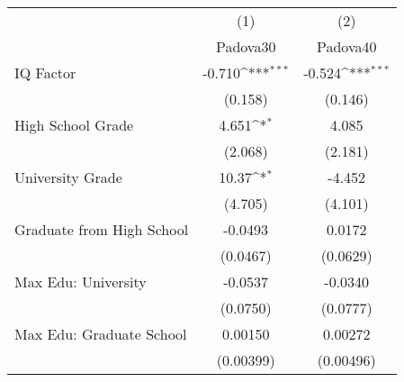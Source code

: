 {
\def\sym#1{\ifmmode^{#1}\else\(^{#1}\)\fi}
\begin{tabular}{l*{2}{c}}
\toprule
            &\multicolumn{1}{c}{(1)}&\multicolumn{1}{c}{(2)}\\
            &\multicolumn{1}{c}{Padova30}&\multicolumn{1}{c}{Padova40}\\
\midrule
IQ Factor   &      -0.710\sym{***}&      -0.524\sym{***}\\
            &     (0.158)         &     (0.146)         \\
\addlinespace
High School Grade&       4.651\sym{*}  &       4.085         \\
            &     (2.068)         &     (2.181)         \\
\addlinespace
University Grade&       10.37\sym{*}  &      -4.452         \\
            &     (4.705)         &     (4.101)         \\
\addlinespace
Graduate from High School&     -0.0493         &      0.0172         \\
            &    (0.0467)         &    (0.0629)         \\
\addlinespace
Max Edu: University&     -0.0537         &     -0.0340         \\
            &    (0.0750)         &    (0.0777)         \\
\addlinespace
Max Edu: Graduate School&     0.00150         &     0.00272         \\
            &   (0.00399)         &   (0.00496)         \\
\bottomrule
\end{tabular}
}
